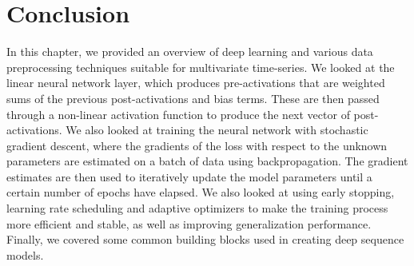 \documentclass{statsmsc}
\begin{document}
{%





\section{Conclusion}%
\label{sec:Conclusion}%

In this chapter, we provided an overview of deep learning and various data preprocessing techniques
suitable for multivariate time-series. We looked at the linear neural network layer, which
produces pre-activations that are weighted sums of the previous post-activations and bias terms.
These are then passed through a non-linear activation function to produce the next vector of
post-activations. We also looked at training the neural network with stochastic gradient descent,
where the gradients of the loss with respect to the unknown parameters are estimated on a batch of
data using backpropagation. The gradient estimates are then used to iteratively update the model
parameters until a certain number of epochs have elapsed. We also looked at using early stopping,
learning rate scheduling and adaptive optimizers to make the training process more efficient and
stable, as well as improving generalization performance. Finally, we covered some common building
blocks used in creating deep sequence models.

}
\end{document}
